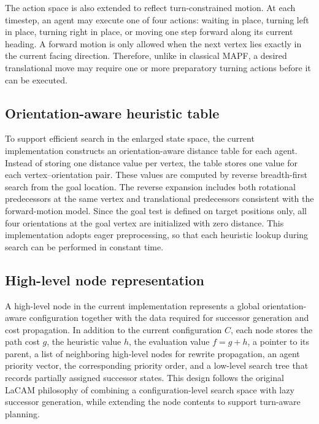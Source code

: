 \documentclass[lettersize,journal]{IEEEtran}
\begin{document}
The action space is also extended to reflect turn-constrained motion. At each timestep, an agent may execute one of four actions: waiting in place, turning left in place, turning right in place, or moving one step forward along its current heading. A forward motion is only allowed when the next vertex lies exactly in the current facing direction. Therefore, unlike in classical MAPF, a desired translational move may require one or more preparatory turning actions before it can be executed. 

\subsection{Orientation-aware heuristic table}
\label{subsec:impl_heuristic}

To support efficient search in the enlarged state space, the current implementation constructs an orientation-aware distance table for each agent. Instead of storing one distance value per vertex, the table stores one value for each vertex--orientation pair. These values are computed by reverse breadth-first search from the goal location. The reverse expansion includes both rotational predecessors at the same vertex and translational predecessors consistent with the forward-motion model. Since the goal test is defined on target positions only, all four orientations at the goal vertex are initialized with zero distance. This implementation adopts eager preprocessing, so that each heuristic lookup during search can be performed in constant time. 

\subsection{High-level node representation}
\label{subsec:impl_hnode}

A high-level node in the current implementation represents a global orientation-aware configuration together with the data required for successor generation and cost propagation. In addition to the current configuration $C$, each node stores the path cost $g$, the heuristic value $h$, the evaluation value $f=g+h$, a pointer to its parent, a list of neighboring high-level nodes for rewrite propagation, an agent priority vector, the corresponding priority order, and a low-level search tree that records partially assigned successor states. This design follows the original LaCAM philosophy of combining a configuration-level search space with lazy successor generation, while extending the node contents to support turn-aware planning. 
\end{document}
